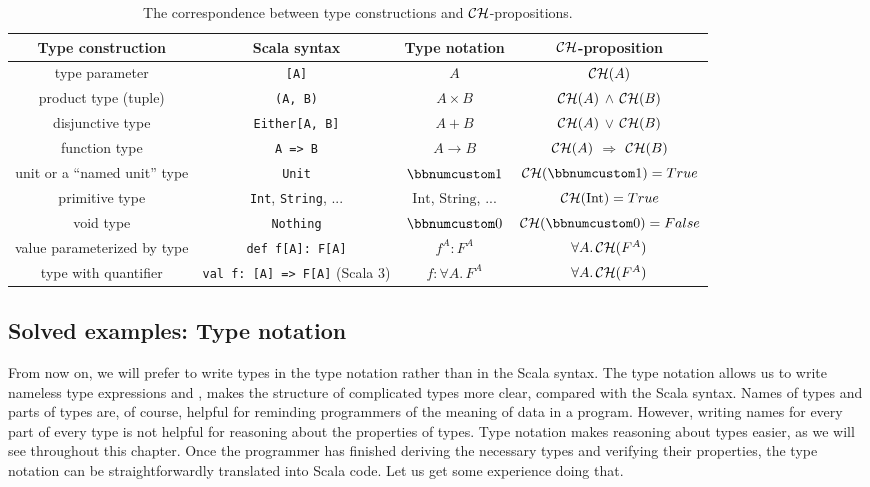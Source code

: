\begin{table}
\begin{centering}
\begin{tabular}{|c|c|c|c|}
\hline 
\textbf{\small{}Type construction} & \textbf{\small{}Scala syntax} & \textbf{\small{}Type notation} & \textbf{\small{}${\cal CH}$-proposition}\tabularnewline
\hline 
\hline 
{\small{}type parameter} & \lstinline![A]! & $A$ & ${\cal CH}(A)$\tabularnewline
\hline 
{\small{}product type (tuple)}  & \lstinline!(A, B)! & $A\times B$ & ${\cal CH}(A)$ $\wedge$ ${\cal CH}(B)$\tabularnewline
\hline 
{\small{}disjunctive type}  & \lstinline!Either[A, B]! & $A+B$ & ${\cal CH}(A)$ $\vee$ ${\cal CH}(B)$\tabularnewline
\hline 
{\small{}function type}  & \lstinline!A => B! & $A\rightarrow B$ & ${\cal CH}(A)$ $\Rightarrow$ ${\cal CH}(B)$\tabularnewline
\hline 
{\small{}unit or a \textsf{``}named unit\textsf{''} type} & \lstinline!Unit! & $\bbnum 1$ & ${\cal CH}(\bbnum 1)=True$\tabularnewline
\hline 
{\small{}primitive type} & {\small{}}\lstinline!Int!{\small{}, }\lstinline!String!{\small{},
...} & {\small{}$\text{Int}$, $\text{String}$, ...} & ${\cal CH}(\text{Int})=True$\tabularnewline
\hline 
{\small{}void type} & \lstinline!Nothing! & $\bbnum 0$ & ${\cal CH}(\bbnum 0)=False$\tabularnewline
\hline 
{\small{}value parameterized by type} & \lstinline!def f[A]: F[A]! & $f^{A}:F^{A}$ & $\forall A.\,{\cal CH}(F^{A})$\tabularnewline
\hline 
{\small{}type with quantifier} & \lstinline!val f: [A] => F[A]!{\small{} (Scala 3)} & $f:\forall A.\,F^{A}$ & $\forall A.\,{\cal CH}(F^{A})$\tabularnewline
\hline 
\end{tabular}
\par\end{centering}
\caption{The correspondence between type constructions
and ${\cal CH}$-propositions.\label{tab:ch-correspondence-type-notation-CH-propositions}}
\end{table}


\subsection{Solved examples: Type notation}

From now on, we will prefer to write types in the type notation rather
than in the Scala syntax. The type notation allows us to write nameless
type expressions and , makes the structure of complicated types more
clear, compared with the Scala syntax. Names of types and parts of
types are, of course, helpful for reminding programmers of the meaning
of data in a program. However, writing names for every part of every
type is not helpful for reasoning about the properties of types. Type
notation makes reasoning about types easier, as we will see throughout
this chapter. Once the programmer has finished deriving the necessary
types and verifying their properties, the type notation can be straightforwardly
translated into Scala code. Let us get some experience doing that.

